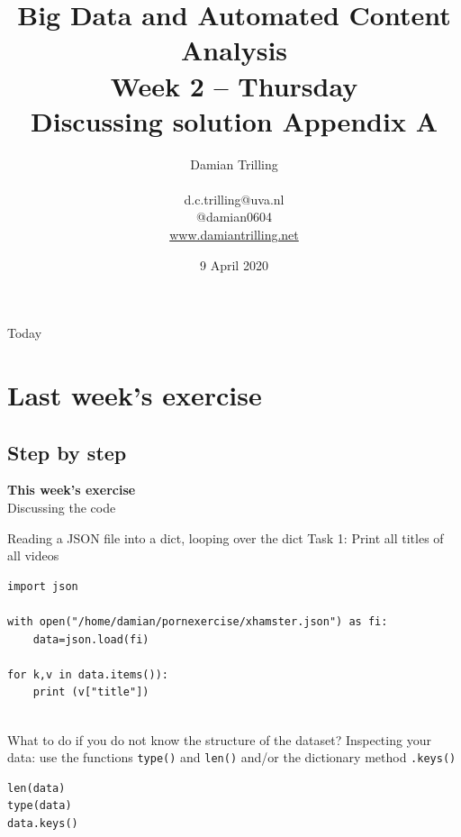 \documentclass{beamer}
\title[Big Data and Automated Content Analysis]{\textbf{Big Data and Automated Content Analysis} \\ Week 2 -- Thursday \\ Discussing solution Appendix A}
\author[Damian Trilling]{Damian Trilling \\ ~ \\ \footnotesize{d.c.trilling@uva.nl \\@damian0604} \\ \url{www.damiantrilling.net}}
\date{9 April 2020}
\institute[UvA]{Afdeling Communicatiewetenschap \\Universiteit van Amsterdam}
\begin{document}
\begin{frame}{}
\titlepage
\end{frame}

\begin{frame}{Today}
\tableofcontents
\end{frame}



\section{Last week's exercise}
\subsection{Step by step}
\begin{frame}[plain]
\textbf{This week's exercise}\\
\vspace{1cm}
Discussing the code
\end{frame}



\begin{frame}[fragile]{Reading a JSON file into a dict, looping over the dict}
Task 1: Print all titles of all videos
\begin{lstlisting}
import json

with open("/home/damian/pornexercise/xhamster.json") as fi:
    data=json.load(fi)

for k,v in data.items()):
    print (v["title"])
            
\end{lstlisting}
\end{frame}


\begin{frame}[fragile]{What to do if you do not know the structure of the dataset?}
	Inspecting your data: use the functions \texttt{type()} and \texttt{len()} and/or the dictionary method \texttt{.keys()}
\begin{lstlisting}
len(data)
type(data)
data.keys()
\end{lstlisting}
\end{frame}
\end{document}
